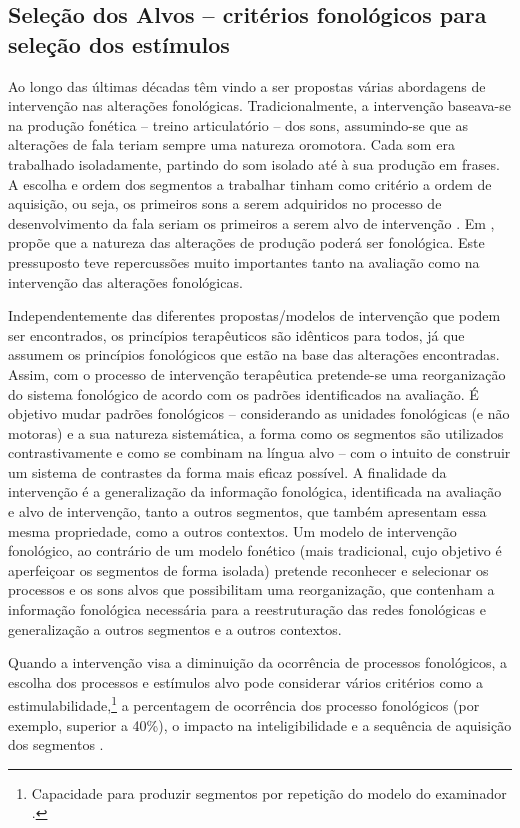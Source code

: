 \documentclass[output=paper,colorlinks,citecolor=brown,booklanguage=portuguese]{langscibook}
\begin{document}
\subsection{Seleção dos Alvos -- critérios fonológicos para seleção dos estímulos}
Ao longo das últimas décadas têm vindo a ser propostas várias abordagens de intervenção nas alterações fonológicas. Tradicionalmente, a intervenção basea\-va-se na produção fonética -- treino articulatório -- dos sons, assumindo-se que as alterações de fala teriam sempre uma natureza oromotora. Cada som era trabalhado isoladamente, partindo do som isolado até à sua produção em frases. A escolha e ordem dos segmentos a trabalhar tinham como critério a ordem de aquisição, ou seja, os primeiros sons a serem adquiridos no processo de desenvolvimento da fala seriam os primeiros a serem alvo de intervenção \citep{Riper1984, Mota2001, Alves2018, Yavas2001}. Em \citeyear{Ingram1976}, \citeauthor{Ingram1976} propõe que a natureza das alterações de produção poderá ser fonológica. Este pressuposto teve repercussões muito importantes tanto na avaliação como na intervenção das alterações fonológicas. 

Independentemente das diferentes propostas/modelos de intervenção que podem ser encontrados, os princípios terapêuticos são idênticos para todos, já que assumem os princípios fonológicos que estão na base das alterações encontradas. Assim, com o processo de intervenção terapêutica pretende-se uma reorganização do sistema fonológico de acordo com os padrões identificados na avaliação. É objetivo mudar padrões fonológicos -- considerando as unidades fonológicas (e não motoras) e a sua natureza sistemática, a forma como os segmentos são utilizados contrastivamente e como se combinam na língua alvo -- com o intuito de construir um sistema de contrastes da forma mais eficaz possível. A finalidade da intervenção é a generalização da informação fonológica, identificada na avaliação e alvo de intervenção, tanto a outros segmentos, que também apresentam essa mesma propriedade, como a outros contextos. Um mo\-delo de intervenção fonológico, ao contrário de um modelo fonético (mais tradicional, cujo objetivo é aperfeiçoar os segmentos de forma isolada) pretende reconhecer e selecionar os processos e os sons alvos que possibilitam uma reorganização, que contenham a informação fonológica necessária para a reestruturação das redes fonológicas e generalização a outros segmentos e a outros contextos.  

Quando a intervenção visa a diminuição da ocorrência de processos fonológicos, a escolha dos processos e estímulos alvo pode considerar vários critérios como a estimulabilidade,\footnote{Capacidade para produzir segmentos por repetição do modelo do examinador \citep{Rvachew2018}.} a percentagem de ocorrência dos processo fonológicos (por exemplo, superior a 40\%), o impacto na inteligibilidade e a sequência de aquisição dos segmentos \citep{Dodd2000}.
\end{document}
